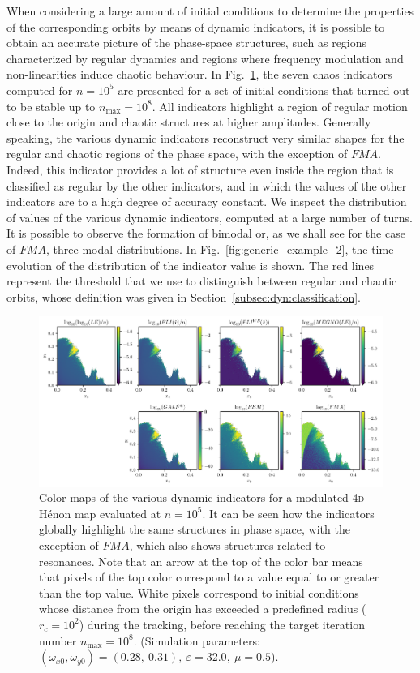 \begin{chapterappendices}
When considering a large amount of initial conditions to determine the properties of the corresponding orbits by means of dynamic indicators, it is possible to obtain an accurate picture of the phase-space structures, such as regions characterized by regular dynamics and regions where frequency modulation and non-linearities induce chaotic behaviour. In Fig.~\ref{fig:generic_example}, the seven chaos indicators computed for $n=10^5$ are presented for a set of initial conditions that turned out to be stable up to $n_\text{max}=10^8$. All indicators highlight a region of regular motion close to the origin and chaotic structures at higher amplitudes. Generally speaking, the various dynamic indicators reconstruct very similar shapes for the regular and chaotic regions of the phase space, with the exception of $FMA$. Indeed, this indicator provides a lot of structure even inside the region that is classified as regular by the other indicators, and in which the values of the other indicators are to a high degree of accuracy constant. We inspect the distribution of values of the various dynamic indicators, computed at a large number of turns. It is possible to observe the formation of bimodal or, as we shall see for the case of $FMA$, three-modal distributions. In Fig.~\ref{fig:generic_example_2}, the time evolution of the distribution of the indicator value is shown. The red lines represent the threshold that we use to distinguish between regular and chaotic orbits, whose definition was given in Section~\ref{subsec:dyn:classification}.

\begin{figure}[ht]
    \centering
    \includegraphics[width=\textwidth]{6_dynamic_indicators/fig/corrected_figs/overview.pdf}
    \caption{Color maps of the various dynamic indicators for a modulated 4\textsc{d} Hénon map evaluated at $n=10^5$. It can be seen how the indicators globally highlight the same structures in phase space, with the exception of $FMA$, which also shows structures related to resonances. Note that an arrow at the top of the color bar means that pixels of the top color correspond to a value equal to or greater than the top value. White pixels correspond to initial conditions whose distance from the origin has exceeded a predefined radius ($r_c=10^2$) during the tracking, before reaching the target iteration number $n_\text{max}=10^8$. (Simulation parameters: $(\omega_{x0},\omega_{y0})= (0.28,\ 0.31),\ \varepsilon=32.0,\ \mu=0.5$).}
    \label{fig:generic_example}
\end{figure}


\end{chapterappendices}
